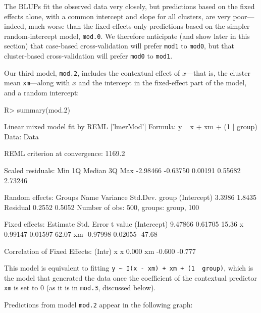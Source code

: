 \documentclass[
]{jss}
\begin{document}
The BLUPs fit the observed data very closely, but predictions based on
the fixed effects alone, with a common intercept and slope for all
clusters, are very poor---indeed, much worse than the fixed-effects-only
predictions based on the simpler random-intercept model, \texttt{mod.0}.
We therefore anticipate (and show later in this section) that case-based
cross-validation will prefer \texttt{mod1} to \texttt{mod0}, but that
cluster-based cross-validation will prefer \texttt{mod0} to
\texttt{mod1}.

Our third model, \texttt{mod.2}, includes the contextual effect of
\(x\)---that is, the cluster mean \texttt{xm}---along with \(x\) and the
intercept in the fixed-effect part of the model, and a random intercept:

\begin{CodeChunk}
\begin{CodeInput}
R> summary(mod.2)
\end{CodeInput}
\begin{CodeOutput}
Linear mixed model fit by REML ['lmerMod']
Formula: y ~ x + xm + (1 | group)
   Data: Data

REML criterion at convergence: 1169.2

Scaled residuals: 
     Min       1Q   Median       3Q      Max 
-2.98466 -0.63750  0.00191  0.55682  2.73246 

Random effects:
 Groups   Name        Variance Std.Dev.
 group    (Intercept) 3.3986   1.8435  
 Residual             0.2552   0.5052  
Number of obs: 500, groups:  group, 100

Fixed effects:
            Estimate Std. Error t value
(Intercept)  9.47866    0.61705   15.36
x            0.99147    0.01597   62.07
xm          -0.97998    0.02055  -47.68

Correlation of Fixed Effects:
   (Intr) x     
x   0.000       
xm -0.600 -0.777
\end{CodeOutput}
\end{CodeChunk}

This model is equivalent to fitting
\texttt{y\ \textasciitilde{}\ I(x\ -\ xm)\ +\ xm\ +\ (1\ \textbar{}\ group)},
which is the model that generated the data once the coefficient of the
contextual predictor \texttt{xm} is set to 0 (as it is in
\texttt{mod.3}, discussed below).

Predictions from model \texttt{mod.2} appear in the following graph:
\end{document}
